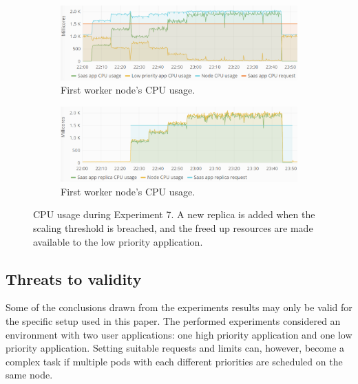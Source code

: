 %
%
\begin{figure}
\centering
\begin{subfigure}[b]{0.9\columnwidth}
\centering
\includegraphics[width=0.75\columnwidth]{Images/Experiments/CPU/Grafana/cpu-saas-lpp-hpa-li-1.PNG}
\caption{First worker node's CPU usage.}
\label{fig:cpu-saas-lpp-hpa-li-1}
\end{subfigure}
\hfill
\begin{subfigure}[b]{0.9\columnwidth}
\centering
\includegraphics[width=0.75\columnwidth]{Images/Experiments/CPU/Grafana/cpu-saas-lpp-hpa-li-2.PNG}
\caption{First worker node's CPU usage.}
\label{fig:cpu-saas-lpp-hpa-li-2}
\end{subfigure}
\hfill
\vspace*{-3mm}
\caption{CPU usage during Experiment 7. A new replica is added when the scaling threshold is breached, and the freed up resources are made available to the low priority application.}
\label{fig:cpu-saas-lpp-hpa-li}
\end{figure}

\subsection{Threats to validity}
Some of the conclusions drawn from the experiments results may only be valid for the specific setup used in this paper. The performed experiments considered an environment with two user applications: one high priority application and one low priority application. Setting suitable requests and limits can, however, become a complex task if multiple pods with each different priorities are scheduled on the same node.

